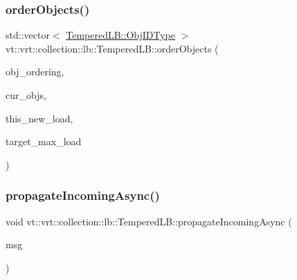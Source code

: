 \subsubsection{\texorpdfstring{order\+Objects()}{orderObjects()}}
{\footnotesize\ttfamily std\+::vector$<$ \hyperlink{structvt_1_1vrt_1_1collection_1_1lb_1_1_base_l_b_a790b22acf448880599724749cdc4e9b3}{Tempered\+L\+B\+::\+Obj\+I\+D\+Type} $>$ vt\+::vrt\+::collection\+::lb\+::\+Tempered\+L\+B\+::order\+Objects (\begin{DoxyParamCaption}\item[{\hyperlink{namespacevt_1_1vrt_1_1collection_1_1lb_a3c71e131f84e2ccbb95f43a1058c749c}{Object\+Order\+Enum}}]{obj\+\_\+ordering,  }\item[{std\+::unordered\+\_\+map$<$ \hyperlink{structvt_1_1vrt_1_1collection_1_1lb_1_1_base_l_b_a790b22acf448880599724749cdc4e9b3}{Obj\+I\+D\+Type}, \hyperlink{namespacevt_a876a9d0cd5a952859c72de8a46881442}{Time\+Type} $>$}]{cur\+\_\+objs,  }\item[{\hyperlink{structvt_1_1vrt_1_1collection_1_1lb_1_1_base_l_b_a215e22b9f12678303f49615ae3be05cc}{Load\+Type}}]{this\+\_\+new\+\_\+load,  }\item[{\hyperlink{namespacevt_a876a9d0cd5a952859c72de8a46881442}{Time\+Type}}]{target\+\_\+max\+\_\+load }\end{DoxyParamCaption})\hspace{0.3cm}{\ttfamily [static]}}

\mbox{\label{structvt_1_1vrt_1_1collection_1_1lb_1_1_tempered_l_b_a15dd6de3c9fe1998dae4bc685c991bb5}} 
\subsubsection{\texorpdfstring{propagate\+Incoming\+Async()}{propagateIncomingAsync()}}
{\footnotesize\ttfamily void vt\+::vrt\+::collection\+::lb\+::\+Tempered\+L\+B\+::propagate\+Incoming\+Async (\begin{DoxyParamCaption}\item[{\hyperlink{structvt_1_1vrt_1_1collection_1_1lb_1_1_tempered_l_b_a38d9ad7e92612cdbdf564b6f49b516a7}{Load\+Msg\+Async} $\ast$}]{msg }\end{DoxyParamCaption})\hspace{0.3cm}{\ttfamily [protected]}}

